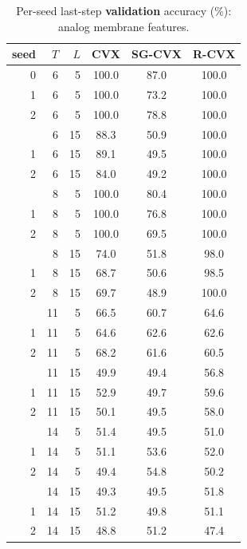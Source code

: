 \documentclass[11pt]{article}
\begin{document}
\begin{table}[p]
\centering
\caption{Per-seed last-step \textbf{validation} accuracy (\%): analog membrane features.}
\label{tab:xor-val-perseed-analog}
\begin{tabular}{rrrccc}
\toprule
seed & $T$ & $L$ & CVX & SG-CVX & R-CVX \\
\midrule
0 & 6 & 5 & 100.0 & 87.0 & 100.0 \\
1 & 6 & 5 & 100.0 & 73.2 & 100.0 \\
2 & 6 & 5 & 100.0 & 78.8 & 100.0 \\
\addlinespace
0 & 6 & 15 & 88.3 & 50.9 & 100.0 \\
1 & 6 & 15 & 89.1 & 49.5 & 100.0 \\
2 & 6 & 15 & 84.0 & 49.2 & 100.0 \\
\addlinespace
0 & 8 & 5 & 100.0 & 80.4 & 100.0 \\
1 & 8 & 5 & 100.0 & 76.8 & 100.0 \\
2 & 8 & 5 & 100.0 & 69.5 & 100.0 \\
\addlinespace
0 & 8 & 15 & 74.0 & 51.8 & 98.0 \\
1 & 8 & 15 & 68.7 & 50.6 & 98.5 \\
2 & 8 & 15 & 69.7 & 48.9 & 100.0 \\
\addlinespace
0 & 11 & 5 & 66.5 & 60.7 & 64.6 \\
1 & 11 & 5 & 64.6 & 62.6 & 62.6 \\
2 & 11 & 5 & 68.2 & 61.6 & 60.5 \\
\addlinespace
0 & 11 & 15 & 49.9 & 49.4 & 56.8 \\
1 & 11 & 15 & 52.9 & 49.7 & 59.6 \\
2 & 11 & 15 & 50.1 & 49.5 & 58.0 \\
\addlinespace
0 & 14 & 5 & 51.4 & 49.5 & 51.0 \\
1 & 14 & 5 & 51.1 & 53.6 & 52.0 \\
2 & 14 & 5 & 49.4 & 54.8 & 50.2 \\
\addlinespace
0 & 14 & 15 & 49.3 & 49.5 & 51.8 \\
1 & 14 & 15 & 51.2 & 49.8 & 51.1 \\
2 & 14 & 15 & 48.8 & 51.2 & 47.4 \\
\bottomrule
\end{tabular}
\end{table}
\end{document}
